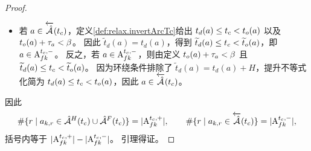 \begin{proof}
\begin{itemize}
    对停留弧同样成立。
    反之，若 $a\in\arcPosi$ 且 $t_o(a)+\travelTime_a < \planningEnd$，则 $\checkTime$ 位于 $t_o(a)$ 和 $t_d(a)$ 之间且无环绕，因此 $a$ 属于 $\holdingArcTc{\checkTime}\cup\flightArcTc{\checkTime}$。
    若 $a\in\arcPosi$ 且 $t_o(a)+\travelTime_a \ge \planningEnd$，则 $\checkTime$ 位于 $\widetilde{t}_o(a)=t_o(a)$ 和 $\widetilde{t}_d(a)=t_d(a)+H$ 之间，迫使 $\holdingArcTc{\checkTime}$ 或 $\flightArcTc{\checkTime}$ 中的环绕条件成立。因此
    \[
        a\in\holdingArcTc{\checkTime}\cup\flightArcTc{\checkTime}
        \iff a\in\arcPosi.
    \]
    \item 若 $a\in\overleftarrow{\hat{\mathcal{A}}}(t_c)$，定义\ref{def:relax.invertArcTc}给出
    $t_d(a)\le t_c < t_o(a)$ 以及 $t_o(a)+\travelTime_a<\planningEnd$。
    因此 $\widetilde{t}_d(a)=t_d(a)$，得到 $\widetilde{t}_d(a) \le t_c < \widetilde{t}_o(a)$，即 $a\in{\mathrm{A}_{fk}^{t_c,-}}$。
    反之，若 $a\in{\mathrm{A}_{fk}^{t_c,-}}$，则由定义 $t_o(a)+\travelTime_a<\planningEnd$ 且
    $\widetilde{t}_d(a) \le t_c < \widetilde{t}_o(a)$。
    因为环绕条件排除了 $\widetilde{t}_d(a)=t_d(a)+H$，提升不等式化简为 $t_d(a)\le t_c < t_o(a)$，因此 $a\in\overleftarrow{\hat{\mathcal{A}}}(t_c)$。
\end{itemize}
因此
\[
    \#\{r \mid a_{k,r}\in{\hat{\mathcal{A}}^H(t_c)}\cup{\hat{\mathcal{A}}^F(t_c)}\}=|{\mathrm{A}_{fk}^{t_c,+}}|,
    \qquad
    \#\{r \mid a_{k,r}\in\overleftarrow{\hat{\mathcal{A}}}(t_c)\}=|{\mathrm{A}_{fk}^{t_c,-}}|,
\]
括号内等于 $|{\mathrm{A}_{fk}^{t_c,+}}|-|{\mathrm{A}_{fk}^{t_c,-}}|$。
引理得证。
\end{proof}